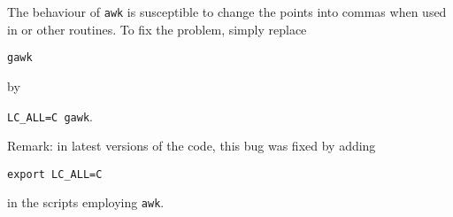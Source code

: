 The behaviour of \texttt{awk} is susceptible to change the points into commas when used in  or other routines. To fix the problem, simply replace

\texttt{gawk}

by

\texttt{LC\_ALL=C gawk}.

Remark: in latest versions of the code, this bug was fixed by adding 

\texttt{export LC\_ALL=C}

in the scripts employing \texttt{awk}.